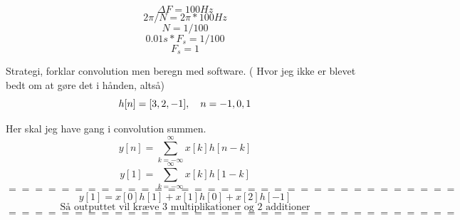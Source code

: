 \begin{EksamensOpgaver}
\begin{Eksamenssæt}[2024 Ordinær]
\begin{eksamensOpgave}
\begin{UnderOpgave}
                \[\Delta F = 100Hz\]
                \[2\pi/N = 2\pi * 100Hz\]
                \[N = 1/100\]
                \[0.01s * F_s = 1/100\]
                \[F_s = 1\]







            \end{UnderOpgave}
            
        \end{eksamensOpgave}
    \end{Eksamenssæt}
    \begin{Eksamenssæt}
        \begin{eksamensOpgave}
            Strategi, forklar convolution men beregn med software. ( Hvor jeg ikke er blevet bedt om at gøre det i hånden, altså)
            \[h[n] = [3, 2, -1], \tab{0} n = -1, 0, 1\]
            \begin{UnderOpgave}
                Her skal jeg have gang i convolution summen. 
                \[y[n] = \sum_{k = -\infty}^{\infty}{x[k]h[n - k]}\]
                \[y[1] = \sum_{k = -\infty}^{\infty}{x[k]h[1 - k]}\]
                \[==================================\]
                \[y[1] = x[0]h[1] + x[1]h[0] + x[2]h[-1]\]
                \[\text{Så outputtet vil kræve 3 multiplikationer og 2 additioner}\]
                \[==================================\]


\end{UnderOpgave}
\end{eksamensOpgave}
\end{Eksamenssæt}
\end{EksamensOpgaver}
